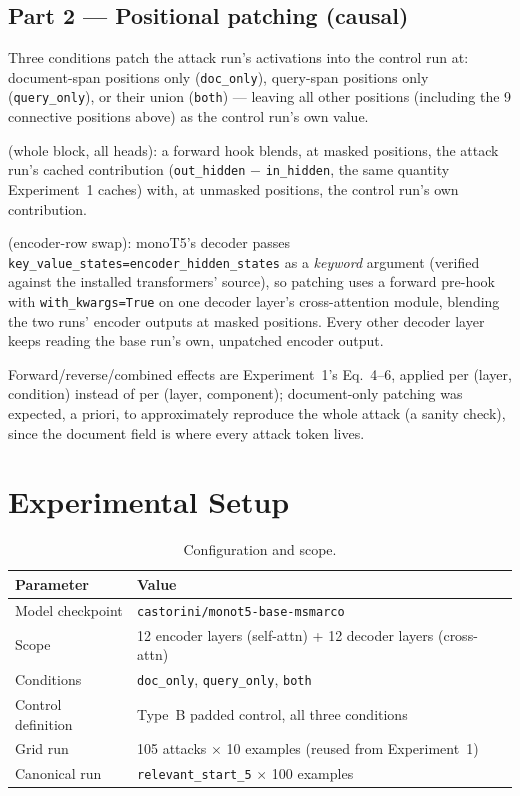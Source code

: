 \documentclass[11pt]{article}
\begin{document}
\subsection{Part 2 — Positional patching (causal)}

Three conditions patch the attack run's activations into the control run
at: document-span positions only (\texttt{doc\_only}), query-span positions
only (\texttt{query\_only}), or their union (\texttt{both}) — leaving all
other positions (including the 9 connective positions above) as the control
run's own value.
\begin{description}[leftmargin=1.6em,style=nextline]
  \item[Encoder self-attention] (whole block, all heads): a forward hook
  blends, at masked positions, the attack run's cached contribution
  (\texttt{out\_hidden} $-$ \texttt{in\_hidden}, the same quantity
  Experiment~1 caches) with, at unmasked positions, the control run's own
  contribution.
  \item[Decoder cross-attention] (encoder-row swap): monoT5's decoder passes
  \texttt{key\_value\_states=encoder\_hidden\_states} as a \emph{keyword}
  argument (verified against the installed transformers' source), so
  patching uses a forward pre-hook with \texttt{with\_kwargs=True} on one
  decoder layer's cross-attention module, blending the two runs' encoder
  outputs at masked positions. Every other decoder layer keeps reading the
  base run's own, unpatched encoder output.
\end{description}
Forward/reverse/combined effects are Experiment~1's Eq.~4--6, applied per
(layer, condition) instead of per (layer, component); document-only
patching was expected, a priori, to approximately reproduce the whole
attack (a sanity check), since the document field is where every attack
token lives.

\section{Experimental Setup}

\begin{table}[H]
\centering
\caption{Configuration and scope.}
\begin{tabular}{ll}
\toprule
Parameter & Value \\
\midrule
Model checkpoint & \texttt{castorini/monot5-base-msmarco} \\
Scope & 12 encoder layers (self-attn) + 12 decoder layers (cross-attn) \\
Conditions & \texttt{doc\_only}, \texttt{query\_only}, \texttt{both} \\
Control definition & Type~B padded control, all three conditions \\
Grid run & 105 attacks $\times$ 10 examples (reused from Experiment~1) \\
Canonical run & \texttt{relevant\_start\_5} $\times$ 100 examples \\
\bottomrule
\end{tabular}
\end{table}
\end{document}
